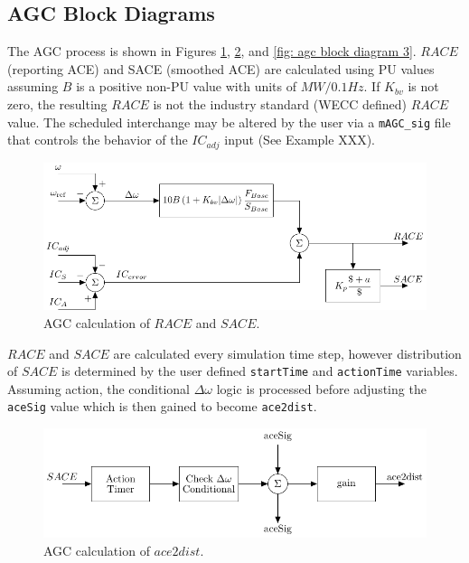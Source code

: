 \subsection{AGC Block Diagrams}
The AGC process is shown in Figures \ref{fig: agc block diagram 1}, \ref{fig: agc block diagram 2}, and \ref{fig: agc block diagram 3}.
$RACE$ (reporting ACE) and SACE (smoothed ACE) are calculated using PU values assuming $B$ is a positive non-PU value with units of $MW/0.1Hz$.
If $K_{bv}$ is not zero, the resulting $RACE$ is not the industry standard (WECC defined) $RACE$ value.
The scheduled interchange may be altered by the user via a \verb|mAGC_sig| file that controls the behavior of the $IC_{adj}$ input (See Example XXX).

\begin{figure}[!h]
	\centering
	\footnotesize
	\includegraphics[width=\linewidth]{sections/agc/200722-AGCblockdiagram-p1}
	\caption{AGC calculation of $RACE$ and $SACE$.}
	\label{fig: agc block diagram 1}
\end{figure}%

\pagebreak
$RACE$ and $SACE$ are calculated every simulation time step, however
distribution of $SACE$ is determined by the user defined \verb|startTime| and \verb|actionTime| variables.
Assuming action, the conditional $\Delta\omega$ logic is processed before adjusting the \verb|aceSig| value which is then gained to become \verb|ace2dist|.

\begin{figure}[!h]
	\centering
	\footnotesize
	\includegraphics[width=\linewidth]{sections/agc/200722-AGCblockdiagram-p2}
	\caption{AGC calculation of $ace2dist$.}
	\label{fig: agc block diagram 2}
\end{figure}%

